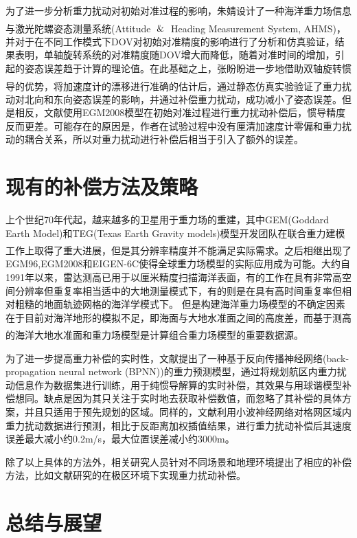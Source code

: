 \documentclass[12pt,a4,utf8]{article}
\newcommand{\upcite}[1]{\textsuperscript{\textsuperscript{\cite{#1}}}} %
\begin{document}
为了进一步分析重力扰动对初始对准过程的影响，朱婧设计了一种海洋重力场信息与激光陀螺姿态测量系统(Attitude $\And$ Heading Measurement System, AHMS)\upcite{1020386196.nh}，并对于在不同工作模式下DOV对初始对准精度的影响进行了分析和仿真验证，结果表明，单轴旋转系统的对准精度随DOV增大而降低，随着对准时间的增加，引起的姿态误差趋于计算的理论值。在此基础之上，张盼盼进一步地借助双轴旋转惯导的优势\upcite{zhang2023gravity}，将加速度计的漂移进行准确的估计后，通过静态仿真实验验证了重力扰动对北向和东向姿态误差的影响，并通过补偿重力扰动，成功减小了姿态误差。但是相反，文献\cite{TIE2017impact}使用EGM2008模型在初始对准过程进行重力扰动补偿后，惯导精度反而更差。可能存在的原因是，作者在试验过程中没有厘清加速度计零偏和重力扰动的耦合关系，所以对重力扰动进行补偿后相当于引入了额外的误差。

\section{现有的补偿方法及策略}
上个世纪70年代起，越来越多的卫星用于重力场的重建，其中GEM(Goddard Earth Model)和TEG(Texas Earth Gravity models)模型开发团队在联合重力建模工作上取得了重大进展\upcite{lerch1972gravitational,tapley1997teg}，但是其分辨率精度并不能满足实际需求。之后相继出现了EGM96,EGM2008和EIGEN-6C使得全球重力场模型的实际应用成为可能。大约自1991年以来，雷达测高已用于以厘米精度扫描海洋表面，有的工作在具有非常高空间分辨率但重复率相当适中的大地测量模式下，有的则是在具有高时间重复率但相对粗糙的地面轨迹网格的海洋学模式下。
但是构建海洋重力场模型的不确定因素在于目前对海洋地形的模拟不足，即海面与大地水准面之间的高度差，而基于测高的海洋大地水准面和重力场模型是计算组合重力场模型的重要数据源\upcite{pavlis2012development,flechtner2021satellite}。


为了进一步提高重力补偿的实时性，文献\cite{gao2021real}提出了一种基于反向传播神经网络(back-propagation neural network (BPNN))的重力预测模型，通过将规划航区内重力扰动信息作为数据集进行训练，用于纯惯导解算的实时补偿，其效果与用球谐模型补偿想同。缺点是因为其只关注于实时地去获取补偿数值，而忽略了其补偿的具体方案，并且只适用于预先规划的区域。同样的，文献\cite{ZHOUXIAO2016}利用小波神经网络对格网区域内重力扰动数据进行预测，相比于反距离加权插值结果，进行重力扰动补偿后其速度误差最大减小约0.2m/s，最大位置误差减小约3000m。

除了以上具体的方法外，相关研究人员针对不同场景和地理环境提出了相应的补偿方法，比如文献\cite{LIQIAN2022}研究的在极区环境下实现重力扰动补偿。
\section{总结与展望}
\end{document}
